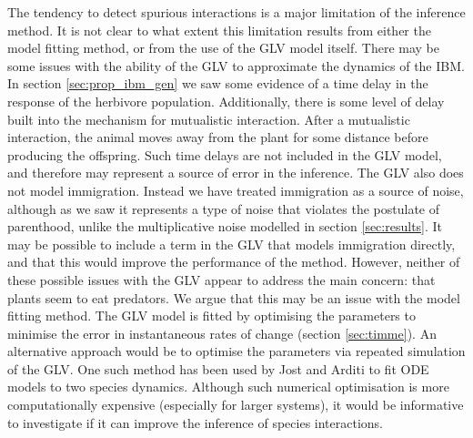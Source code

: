 The tendency to detect spurious interactions is a major limitation of the inference method. It is not clear to what extent this limitation results from either the model fitting method, or from the use of the GLV model itself. There may be some issues with the ability of the GLV to approximate the dynamics of the IBM. In section \ref{sec:prop_ibm_gen} we saw some evidence of a time delay in the response of the herbivore population. Additionally, there is some level of delay built into the mechanism for mutualistic interaction. After a mutualistic interaction, the animal moves away from the plant for some distance before producing the offspring. Such time delays are not included in the GLV model, and therefore may represent a source of error in the inference. The GLV also does not model immigration. Instead we have treated immigration as a source of noise, although as we saw it represents a type of noise that violates the postulate of parenthood, unlike the multiplicative noise modelled in section \ref{sec:results}. It may be possible to include a term in the GLV that models immigration directly, and that this would improve the performance of the method. However, neither of these possible issues with the GLV appear to address the main concern: that plants seem to eat predators. We argue that this may be an issue with the model fitting method. The GLV model is fitted by optimising the parameters to minimise the error in instantaneous rates of change (section \ref{sec:timme}). An alternative approach would be to optimise the parameters via repeated simulation of the GLV. One such method has been used by Jost and Arditi \cite{jost2000identifying} to fit ODE models to two species dynamics. Although such numerical optimisation is more computationally expensive (especially for larger systems), it would be informative to investigate if it can improve the inference of species interactions.

